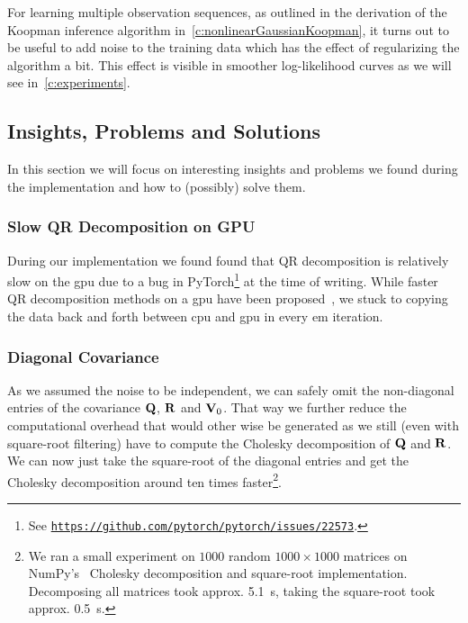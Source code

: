 	For learning multiple observation sequences, as outlined in the derivation of the Koopman inference algorithm in~\autoref{c:nonlinearGaussianKoopman}, it turns out to be useful to add noise to the training data which has the effect of regularizing the algorithm a bit. This effect is visible in smoother log-likelihood curves as we will see in~\autoref{c:experiments}.

	\subsection{Insights, Problems and Solutions}
		In this section we will focus on interesting insights and problems we found during the implementation and how to (possibly) solve them.

		\subsubsection{Slow QR Decomposition on GPU}
			During our implementation we found found that QR decomposition is relatively slow on the \ac{gpu} due to a bug in PyTorch\footnote{See \href{https://web.archive.org/web/20201110121407/https://github.com/pytorch/pytorch/issues/22573}{\texttt{https://github.com/pytorch/pytorch/issues/22573}}.} at the time of writing. While faster QR decomposition methods on a \ac{gpu} have been proposed~\cite{andersonCommunicationAvoidingQRDecomposition2011a}, we stuck to copying the data back and forth between \ac{cpu} and \ac{gpu} in every \ac{em} iteration.

		\subsubsection{Diagonal Covariance}
			As we assumed the noise to be independent, we can safely omit the non-diagonal entries of the covariance \( \boldsymbol{\mathrm{Q}} \), \( \boldsymbol{\mathrm{R}} \) and \( \boldsymbol{\mathrm{V}}_0 \). That way we further reduce the computational overhead that would other wise be generated as we still (even with square-root filtering) have to compute the Cholesky decomposition of \( \boldsymbol{\mathrm{Q}} \) and \( \boldsymbol{\mathrm{R}} \). We can now just take the square-root of the diagonal entries and get the Cholesky decomposition around ten times faster\footnote{We ran a small experiment on \(1000\) random \( 1000 \times 1000 \) matrices on NumPy's~\cite{harrisArrayProgrammingNumPy2020} Cholesky decomposition and square-root implementation. Decomposing all matrices took approx. \SI{5.1}{\second}, taking the square-root took approx. \SI{0.5}{\second}.}.

